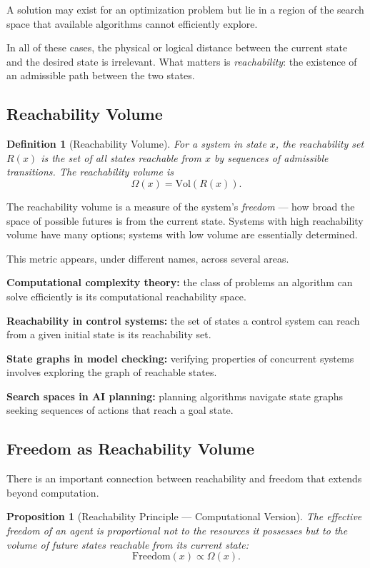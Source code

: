 \documentclass[11pt, a4paper]{article}
\theoremstyle{named}
\newtheorem{proposition}{Proposition}
\newtheorem{definition}{Definition}
\begin{document}
A solution may exist for an optimization problem but lie in a region
of the search space that available algorithms cannot efficiently
explore.

In all of these cases, the physical or logical distance between the
current state and the desired state is irrelevant. What matters is
\emph{reachability}: the existence of an admissible path between the
two states.

\subsection{Reachability Volume}

\begin{definition}[Reachability Volume]
For a system in state $x$, the reachability set $R(x)$ is the set
of all states reachable from $x$ by sequences of admissible
transitions. The reachability volume is
\[
  \Omega(x) = \mathrm{Vol}(R(x)).
\]
\end{definition}

The reachability volume is a measure of the system's \emph{freedom}
--- how broad the space of possible futures is from the current state.
Systems with high reachability volume have many options; systems with
low volume are essentially determined.

This metric appears, under different names, across several areas.

\textbf{Computational complexity theory:} the class of problems an
algorithm can solve efficiently is its computational reachability
space.

\textbf{Reachability in control systems:} the set of states a control
system can reach from a given initial state is its reachability set.

\textbf{State graphs in model checking:} verifying properties of
concurrent systems involves exploring the graph of reachable states.

\textbf{Search spaces in AI planning:} planning algorithms navigate
state graphs seeking sequences of actions that reach a goal state.

\subsection{Freedom as Reachability Volume}

There is an important connection between reachability and freedom that
extends beyond computation.

\begin{proposition}[Reachability Principle --- Computational Version]
The effective freedom of an agent is proportional not to the resources
it possesses but to the volume of future states reachable from its
current state:
\[
  \mathrm{Freedom}(x) \propto \Omega(x).
\]
\end{proposition}
\end{document}
